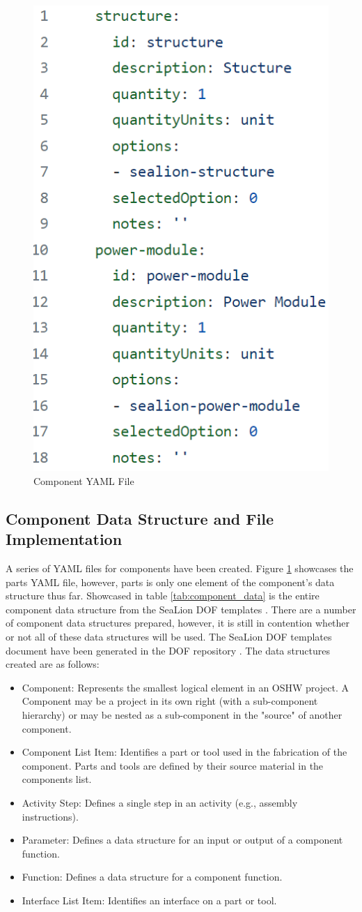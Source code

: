 \documentclass[journal,article,submit,pdftex,moreauthors]{Definitions/mdpi}
\begin{document}
\begin{figure}[H]
    \includegraphics[width=5 cm]{assets/components.png}
    \caption{Component YAML File}
	\label{fig:components}
    \end{figure}   
\unskip

\subsection{Component Data Structure and File Implementation}
A series of YAML files for components have been created.  Figure \ref{fig:components} showcases the parts YAML file, however, parts is only one element of the component's data structure thus far.  Showcased in table \ref{tab:component_data} is the entire component data structure from the SeaLion DOF templates \cite{sealion_dof}.  There are a number of component data structures prepared, however, it is still in contention whether or not all of these data structures will be used.  The SeaLion DOF templates document have been generated in the DOF repository \cite{sealion_dof}.  The data structures created are as follows:

\begin{itemize}
	\item	Component: Represents the smallest logical element in an OSHW project. A Component may be a project in its own right (with a sub-component hierarchy) or may be nested as a sub-component in the "source" of another component.
	\item	Component List Item: Identifies a part or tool used in the fabrication of the component. Parts and tools are defined by their source material in the components list.
	\item	Activity Step: Defines a single step in an activity (e.g., assembly instructions).
	\item	Parameter: Defines a data structure for an input or output of a component function.
	\item	Function: Defines a data structure for a component function.
	\item	Interface List Item: Identifies an interface on a part or tool.
\end{itemize}
\end{document}
